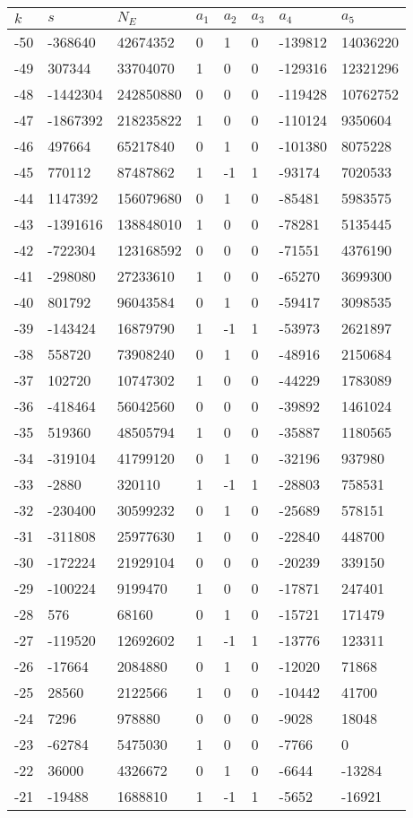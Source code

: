 \documentclass{amsart}
\begin{document}
\begin{longtable}{|l|l|l|lllll|}
\hline
$k$ & $s$ & $N_E$ & $a_1$ & $a_2$ & $a_3$ & $a_4$ & $a_5$\\
\hline
-50&-368640&42674352&0&1&0&-139812&14036220\\
-49&307344&33704070&1&0&0&-129316&12321296\\
-48&-1442304&242850880&0&0&0&-119428&10762752\\
-47&-1867392&218235822&1&0&0&-110124&9350604\\
-46&497664&65217840&0&1&0&-101380&8075228\\
-45&770112&87487862&1&-1&1&-93174&7020533\\
-44&1147392&156079680&0&1&0&-85481&5983575\\
-43&-1391616&138848010&1&0&0&-78281&5135445\\
-42&-722304&123168592&0&0&0&-71551&4376190\\
-41&-298080&27233610&1&0&0&-65270&3699300\\
-40&801792&96043584&0&1&0&-59417&3098535\\
-39&-143424&16879790&1&-1&1&-53973&2621897\\
-38&558720&73908240&0&1&0&-48916&2150684\\
-37&102720&10747302&1&0&0&-44229&1783089\\
-36&-418464&56042560&0&0&0&-39892&1461024\\
-35&519360&48505794&1&0&0&-35887&1180565\\
-34&-319104&41799120&0&1&0&-32196&937980\\
-33&-2880&320110&1&-1&1&-28803&758531\\
-32&-230400&30599232&0&1&0&-25689&578151\\
-31&-311808&25977630&1&0&0&-22840&448700\\
-30&-172224&21929104&0&0&0&-20239&339150\\
-29&-100224&9199470&1&0&0&-17871&247401\\
-28&576&68160&0&1&0&-15721&171479\\
-27&-119520&12692602&1&-1&1&-13776&123311\\
-26&-17664&2084880&0&1&0&-12020&71868\\
-25&28560&2122566&1&0&0&-10442&41700\\
-24&7296&978880&0&0&0&-9028&18048\\
-23&-62784&5475030&1&0&0&-7766&0\\
-22&36000&4326672&0&1&0&-6644&-13284\\
-21&-19488&1688810&1&-1&1&-5652&-16921\\

\end{longtable}
\end{document}
